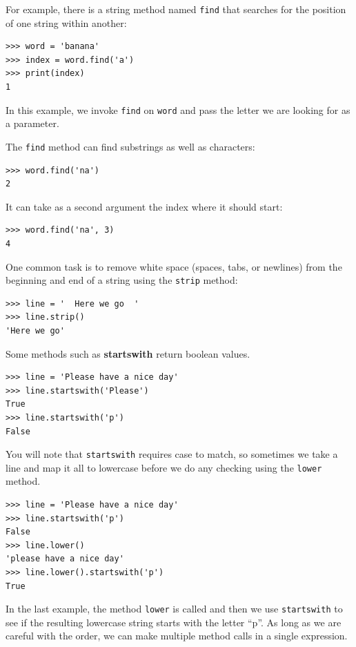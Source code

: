 
For example, there is a string method named {\tt find} that
searches for the position of one string within another:

\beforeverb
\begin{verbatim}
>>> word = 'banana'
>>> index = word.find('a')
>>> print(index)
1
\end{verbatim}
\afterverb
%
In this example, we invoke {\tt find} on {\tt word} and pass
the letter we are looking for as a parameter.

The {\tt find} method can find substrings as well as characters:

\beforeverb
\begin{verbatim}
>>> word.find('na')
2
\end{verbatim}
\afterverb
%
It can take as a second argument the index where it should start:


\beforeverb
\begin{verbatim}
>>> word.find('na', 3)
4
\end{verbatim}
\afterverb
%
One common task is to remove white space (spaces, tabs, or newlines) from
the beginning and end of a string using the {\tt strip} method:

\beforeverb
\begin{verbatim}
>>> line = '  Here we go  '
>>> line.strip()
'Here we go'
\end{verbatim}
\afterverb
%
Some methods such as {\bf startswith} return boolean values.

\beforeverb
\begin{verbatim}
>>> line = 'Please have a nice day'
>>> line.startswith('Please')
True
>>> line.startswith('p')
False
\end{verbatim}
\afterverb
%
\label{ch6StartsWithExample}
You will note that {\tt startswith} requires case to match, so sometimes
we take a line and map it all to lowercase before we do any checking
using the {\tt lower} method.

\beforeverb
\begin{verbatim}
>>> line = 'Please have a nice day'
>>> line.startswith('p')
False
>>> line.lower()
'please have a nice day'
>>> line.lower().startswith('p')
True
\end{verbatim}
\afterverb
%
In the last example, the method {\tt lower} is called
and then we use {\tt startswith}
to see if the resulting lowercase string
starts with the letter ``p''.  As long as we are careful
with the order, we can make multiple method calls in a
single expression.


